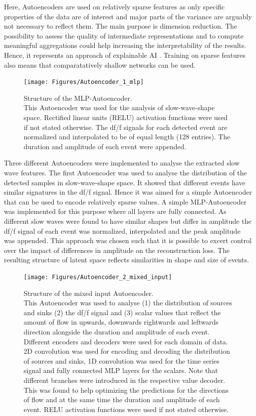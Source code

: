   Here, Autoencoders are used on relatively sparse features as only specific properties of the data are of interest and major parts of the variance are arguably not necessary to reflect them. The main purpose is dimension reduction. The possibility to assess the quality of intermediate representations and to compute meaningful aggregations could help increasing the interpretability of the results. Hence, it represents an approach of explainable AI \parencite{montavon2018methods}. Training on sparse features also means that comparatatively shallow networks can be used.\\
\begin{figure}[!htb]
\centering
\texttt{[image: Figures/Autoencoder\_1\_mlp]}
\decoRule
\caption[Structure of the MLP Autoencoder]{Structure of the MLP-Autoencoder.\\ This Autoencoder was used for the analysis of slow-wave-shape space. Rectified linear units (RELU) activation functions were used if not stated otherwise. The df/f signals for each detected event are normalized and interpolated to be of equal length (128 entries). The duration and amplitude of each event were appended.}
\label{fig:Autoencoder_1_mlp}
\end{figure}
Three different Autoencoders were implemented to analyse the extracted slow wave features. The first Autoencoder was used to analyse the distribution of the detected samples in slow-wave-shape space. It showed that different events have similar signatures in the df/f signal. Hence it was aimed for a simple Autoencoder that can be used to encode relatively sparse values. A simple MLP-Autoencoder was implemented for this purpose where all layers are fully connected. As different slow waves were found to have similar shapes but differ in amplitude the df/f signal of each event was normalized, interpolated and the peak amplitude was appended. This approach was chosen such that it is possible to excert control over the impact of differences in amplitude on the reconstruction loss. The resulting structure of latent space reflects similarities in shape and size of events.\\
\begin{figure}[!htb]
\centering
\texttt{[image: Figures/Autoencoder\_2\_mixed\_input]}
\decoRule
\caption[Structure of the mixed input Autoencoder]{Structure of the mixed input Autoencoder.\\ This Autoencoder was used to analyse (1) the distribution of sources and sinks (2) the df/f signal and (3) scalar values that reflect the amount of flow in upwards, downwards rightwards and leftwards direction alongside the duration and amplitude of each event. Different encoders and decoders were used for each domain of data. 2D convolution was used for encoding and decoding the distribution of sources and sinks, 1D convolution was used for the time series signal and fully connected MLP layers for the scalars. Note that different branches were introduced in the respective value decoder. This was found to help optimizing the predictions for the directions of flow and at the same time the duration and amplitude of each event. RELU activation functions were used if not stated otherwise.}
\label{fig:Autoencoder_2_mixed_input}
\end{figure}
